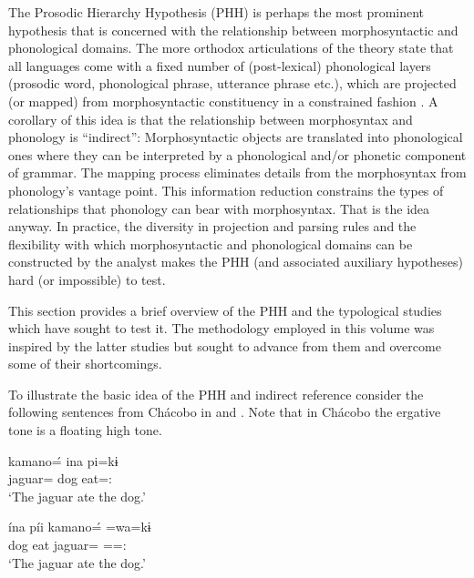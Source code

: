 \documentclass[output=paper,hidelinks]{langscibook}
\begin{document}
The Prosodic Hierarchy Hypothesis (PHH) is perhaps the most prominent hypothesis that is concerned with the relationship between morphosyntactic and phonological domains. The more orthodox articulations of the theory state that all languages come with a fixed number of (post-lexical) phonological layers (prosodic word, phonological phrase, utterance phrase etc.), which are projected (or mapped) from morphosyntactic constituency in a constrained fashion \citep[111]{vogel2023is}. A corollary of this idea is that the relationship between morphosyntax and phonology is ``indirect'': Morphosyntactic objects are translated into phonological ones where they can be interpreted by a phonological and/or phonetic component of grammar. The mapping process eliminates details from the morphosyntax from phonology's vantage point. This information reduction constrains the types of relationships that phonology can bear with morphosyntax. That is the idea anyway. In practice, the diversity in projection and parsing rules and the flexibility with which morphosyntactic and phonological domains can be constructed by the analyst makes the PHH (and associated auxiliary hypotheses) hard (or impossible) to test.

This section provides a brief overview of the PHH and the typological studies which have sought to test it. The methodology employed in this volume was inspired by the latter studies but sought to advance from them and overcome some of their shortcomings.

To illustrate the basic idea of the PHH and indirect reference consider the following sentences from Chácobo in  and . Note that in Chácobo the ergative tone is a floating high tone.

\ea \label{ex:chacobo4.1}
    \gll kamano=́  ina pi=kɨ \\
    jaguar=\Erg{} dog eat=\Decl{}:\Pst{} \\
    \glt `The jaguar ate the dog.'
\z 

\ea \label{ex:chacobo5}
    \gll ína píi kamano=́  =wa=kɨ \\
    dog eat jaguar=\Erg{} =\Tr{}=\Decl{}:\Pst{} \\
    \glt `The jaguar ate the dog.'
\z 
\end{document}
